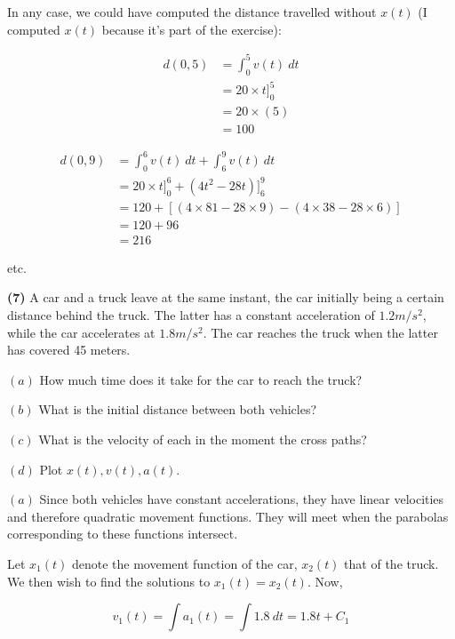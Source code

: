\documentclass[12pt]{article}
\theoremstyle{definition}
\begin{document}
In any case, we could have computed the distance travelled without $x(t)$ (I
computed $x(t)$ because it's part of the exercise):

\begin{align*}
    d(0,5) 
    &= \int_0^5 v(t) ~ dt  \\ 
    &= 20 \times t]_0^5 \\ 
    &= 20 \times (5) \\ 
    &= 100
\end{align*}

\begin{align*}
    d(0, 9) 
    &= \int_0^6 v(t) ~ dt + \int_6^9 v(t) ~ dt \\ 
    &= 20 \times t\Big]_0^6 + (4t^2 - 28t)\Big]_6^9 \\ 
    &=120 + \left[ (4 \times 81 - 28 \times 9) - (4 \times 38 - 28 \times 6)
    \right]  \\ 
    &= 120 + 96 \\ 
    &= 216
\end{align*}

etc.

\pagebreak 

\begin{shaded}
    \textbf{(7)} A car and a truck leave at the same instant, the car initially
    being a certain distance behind the truck. The latter has a constant
    acceleration of $1.2 m / s^2$, while the car accelerates at $1.8 m / s^2$. 
    The car reaches the truck when the latter has covered 45 meters. 

    $(a)$ How much time does it take for the car to reach the truck?

    $(b)$ What is the initial distance between both vehicles?

    $(c)$ What is the velocity of each in the moment the cross paths? 

    $(d)$ Plot $x(t), v(t), a(t)$.
\end{shaded}

$(a)$ Since both vehicles have constant accelerations, they have linear
velocities and therefore quadratic movement functions. They will meet 
when the parabolas corresponding to these functions intersect. 

Let $x_1(t)$ denote the movement function of the car, $x_2(t)$ that of the
truck. We then wish to find the solutions to $x_1(t) = x_2(t)$. Now, 


\begin{equation}
    v_1(t) = \int a_1(t) = \int 1.8 ~ dt = 1.8 t + C_1
\end{equation}
\end{document}
